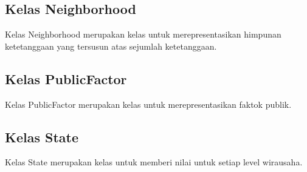 \subsection{Kelas Neighborhood}
	Kelas Neighborhood merupakan kelas untuk merepresentasikan himpunan ketetanggaan yang tersusun atas sejumlah ketetanggaan.
\subsection{Kelas PublicFactor}
	Kelas PublicFactor merupakan kelas untuk merepresentasikan faktok publik.
\subsection{Kelas State}
	Kelas State merupakan kelas untuk memberi nilai untuk setiap level wirausaha.


